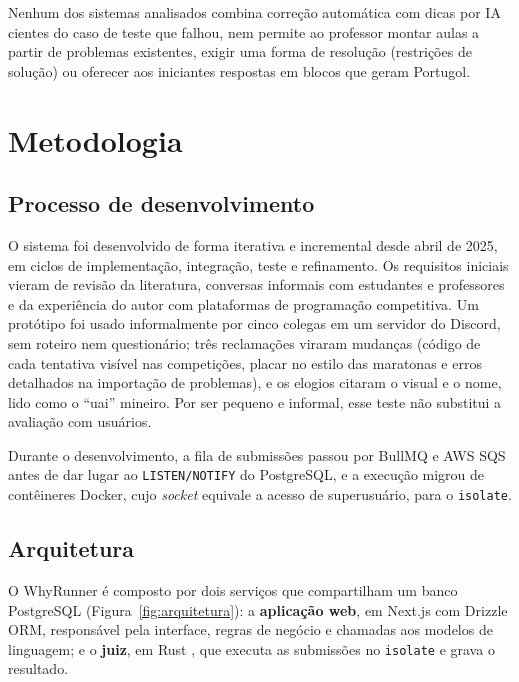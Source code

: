 \documentclass[12pt]{article}
\begin{document}
Nenhum dos sistemas analisados combina correção automática com dicas por IA cientes do caso de teste que falhou, nem permite ao professor montar aulas a partir de problemas existentes, exigir uma forma de resolução (restrições de solução) ou oferecer aos iniciantes respostas em blocos que geram Portugol.

\section{Metodologia}\label{sec:metodologia}

\subsection{Processo de desenvolvimento}

O sistema foi desenvolvido de forma iterativa e incremental desde abril de 2025, em ciclos de implementação, integração, teste e refinamento. Os requisitos iniciais vieram de revisão da literatura, conversas informais com estudantes e professores e da experiência do autor com plataformas de programação competitiva. Um protótipo foi usado informalmente por cinco colegas em um servidor do Discord, sem roteiro nem questionário; três reclamações viraram mudanças (código de cada tentativa visível nas competições, placar no estilo das maratonas e erros detalhados na importação de problemas), e os elogios citaram o visual e o nome, lido como o ``uai'' mineiro. Por ser pequeno e informal, esse teste não substitui a avaliação com usuários.

Durante o desenvolvimento, a fila de submissões passou por BullMQ e AWS SQS antes de dar lugar ao \texttt{LISTEN/NOTIFY} do PostgreSQL, e a execução migrou de contêineres Docker, cujo \emph{socket} equivale a acesso de superusuário, para o \texttt{isolate}.

\subsection{Arquitetura}

O WhyRunner é composto por dois serviços que compartilham um banco PostgreSQL (Figura~\ref{fig:arquitetura}): a \textbf{aplicação web}, em Next.js com Drizzle ORM, responsável pela interface, regras de negócio e chamadas aos modelos de linguagem; e o \textbf{juiz}, em Rust \cite{matsakis2014rust}, que executa as submissões no \texttt{isolate} e grava o resultado.
\end{document}
